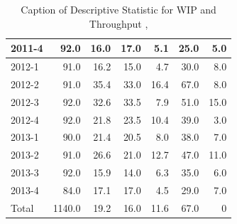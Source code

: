\documentclass[UKenglish]{ifimaster}  %
\begin{document}
\begin{appendices}
\begin{table}[!htbp]
\begin{adjustwidth}{-2.5cm}{}
{{\begin{tabular}{ | l | r | r | r | r | r | r | }
2011-4 & 92.0 & 16.0 & 17.0 & 5.1 & 25.0 & 5.0\\ \hline
2012-1 & 91.0 & 16.2 & 15.0 & 4.7 & 30.0 & 8.0\\ \hline
2012-2 & 91.0 & 35.4 & 33.0 & 16.4 & 67.0 & 8.0\\ \hline
2012-3 & 92.0 & 32.6 & 33.5 & 7.9 & 51.0 & 15.0\\ \hline
2012-4 & 92.0 & 21.8 & 23.5 & 10.4 & 39.0 & 3.0\\ \hline
2013-1 & 90.0 & 21.4 & 20.5 & 8.0 & 38.0 & 7.0\\ \hline
2013-2 & 91.0 & 26.6 & 21.0 & 12.7 & 47.0 & 11.0\\ \hline
2013-3 & 92.0 & 15.9 & 14.0 & 6.3 & 35.0 & 6.0\\ \hline
2013-4 & 84.0 & 17.1 & 17.0 & 4.5 & 29.0 & 7.0\\ \hline
Total & 1140.0 & 19.2 & 16.0 & 11.6 & 67.0 & 0\\ \hline
\end{tabular}
}
}
\end{adjustwidth}
\caption[Optional caption for list of figures]{Caption of Descriptive Statistic for WIP and Throughput  , }
\label{DS:9:1}
\end{table}


\end{appendices}
\end{document}
